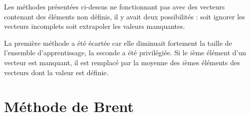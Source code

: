 \documentclass[letterpaper]{article}
\begin{document}
\begin{appendices}
Les méthodes présentées ci-dessus ne fonctionnant pas avec des vecteurs contenant des éléments non définis, il y avait deux possibilités : soit ignorer les vecteurs incomplets soit extrapoler les valeurs manquantes.

La première méthode a été écartée car elle diminuait fortement la taille de l'ensemble d'apprentissage, la seconde a été privilégiée. Si le $i$ème élément d'un vecteur est manquant, il est remplacé par la moyenne des $i$èmes éléments des vecteurs dont la valeur est définie.



\section{Méthode de Brent}


\end{appendices}
\end{document}
